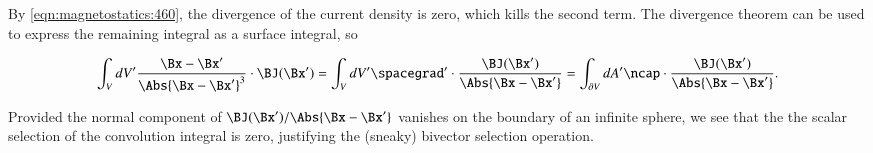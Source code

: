 By \cref{eqn:magnetostatics:460}, the divergence of the current density is zero, which kills the second term.
The divergence theorem can be used to express the remaining integral as a surface integral, so

\begin{dmath}\label{eqn:biotSavartGreens:100}
 \int_V dV' \frac{\Bx - \Bx'}{ \Abs{\Bx - \Bx'}^3 } \cdot \BJ(\Bx')
=  \int_V dV' \spacegrad' \cdot \frac{\BJ(\Bx')}{ \Abs{\Bx - \Bx'} }
=  \int_{\partial V} dA' \ncap \cdot \frac{\BJ(\Bx')}{ \Abs{\Bx - \Bx'} }.
\end{dmath}

Provided the normal component of \( \BJ(\Bx')/\Abs{\Bx - \Bx'} \) vanishes on the boundary of an infinite sphere, we see that the
the scalar selection of the convolution integral is zero, justifying the (sneaky) bivector selection operation.

